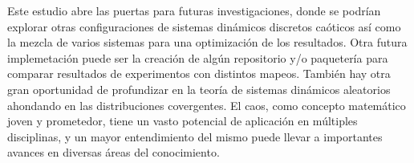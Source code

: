\documentclass[../Main.tex]{subfiles}
\begin{document}
Este estudio abre las puertas para futuras investigaciones, donde se podrían explorar otras configuraciones de sistemas dinámicos discretos caóticos así como la mezcla de varios sistemas para una optimización de los resultados. Otra futura implemetación puede ser la creación de algún repositorio y/o paquetería para comparar resultados de experimentos con distintos mapeos. También hay otra gran oportunidad de profundizar en la teoría de sistemas dinámicos aleatorios ahondando en las distribuciones covergentes. El caos, como concepto matemático joven y prometedor, tiene un vasto potencial de aplicación en múltiples disciplinas, y un mayor entendimiento del mismo puede llevar a importantes avances en diversas áreas del conocimiento.

\end{document}
